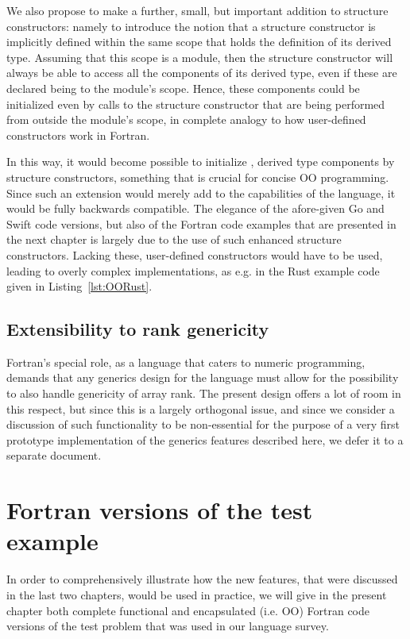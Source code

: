 \documentclass[11pt,oneside]{report}
\newcommand{\code}[1]{{\selectfont\ttfamily{#1}}}
\begin{document}
We also propose to make a further, small, but important addition to
structure constructors: namely to introduce the notion that a
structure constructor is implicitly defined within the same scope that
holds the definition of its derived type. Assuming that this scope is
a module, then the structure constructor will always be able to access
all the components of its derived type, even if these are declared
being \code{private} to the module's scope. Hence, these components
could be initialized even by calls to the structure constructor that
are being performed from outside the module's scope, in complete
analogy to how user-defined constructors work in Fortran.

In this way, it would become possible to initialize \code{private},
\code{allocatable} derived type components by structure constructors,
something that is crucial for concise OO programming. Since such an
extension would merely add to the capabilities of the language, it
would be fully backwards compatible. The elegance of the afore-given
Go and Swift code versions, but also of the Fortran code examples that
are presented in the next chapter is largely due to the use of such
enhanced structure constructors. Lacking these, user-defined
constructors would have to be used, leading to overly complex
implementations, as e.g. in the Rust example code given in
Listing~\ref{lst:OORust}.


\section{Extensibility to rank genericity}

Fortran's special role, as a language that caters to numeric
programming, demands that any generics design for the language must
allow for the possibility to also handle genericity of array rank. The
present design offers a lot of room in this respect, but since this is
a largely orthogonal issue, and since we consider a discussion of such
functionality to be non-essential for the purpose of a very first
prototype implementation of the generics features described here, we
defer it to a separate document.


\chapter{Fortran versions of the test example}

In order to comprehensively illustrate how the new features, that were
discussed in the last two chapters, would be used in practice, we will
give in the present chapter both complete functional and encapsulated
(i.e. OO) Fortran code versions of the test problem that was used in
our language survey.
\end{document}
